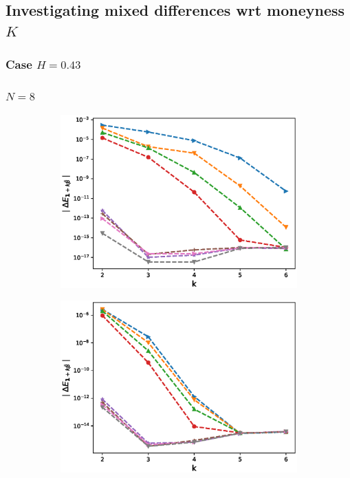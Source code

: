 \documentclass[11pt]{article}
\begin{document}
\newpage
\subsection{Investigating mixed differences wrt moneyness $K$ }\label{sec:mixed differences rbergomi_wrt_moneyness}

\subsubsection*{Case $H=0.43$}
\subsubsection*{$N=8$ }
\begin{figure}[h!]
\centering
\begin{subfigure}{.5\textwidth}
\centering
\includegraphics[width=1\linewidth]{./figures/mixed_diff_second_way/H_043/N_8/first_difference_rbergomi_8steps_H_043_K_1.eps}
\caption{}
\label{fig:sub3}
\end{subfigure}%
\begin{subfigure}{.5\textwidth}
\centering
\includegraphics[width=1\linewidth]{./figures/mixed_diff_second_way/H_043/N_8/first_difference_rbergomi_8steps_H_043_K_exp__4.eps}
\caption{}
\label{fig:sub4}
\end{subfigure}


\end{figure}
\end{document}
